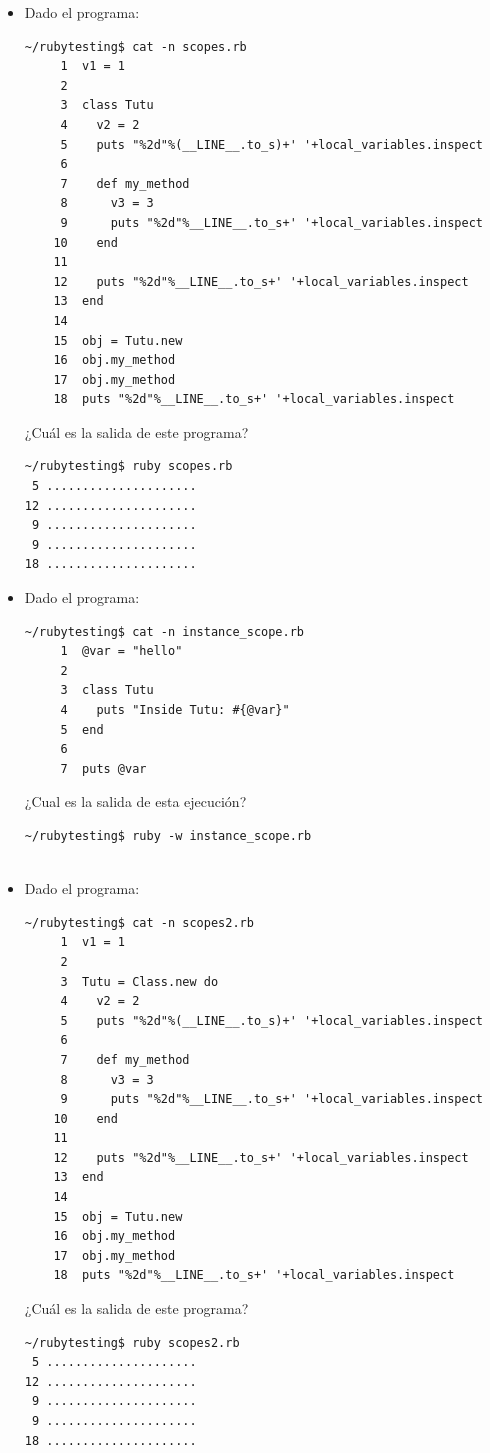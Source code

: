 \begin{itemize}
\begin{verbatim}
\end{verbatim}
 {\it is a command-line tool which allows you to easily install, manage, and work with multiple ruby environments from interpreters to sets of gems.}
\item Dado el programa:
\begin{verbatim}
~/rubytesting$ cat -n scopes.rb 
     1  v1 = 1                  
     2  
     3  class Tutu
     4    v2 = 2                
     5    puts "%2d"%(__LINE__.to_s)+' '+local_variables.inspect    
     6  
     7    def my_method
     8      v3 = 3
     9      puts "%2d"%__LINE__.to_s+' '+local_variables.inspect
    10    end
    11  
    12    puts "%2d"%__LINE__.to_s+' '+local_variables.inspect    
    13  end
    14  
    15  obj = Tutu.new
    16  obj.my_method        
    17  obj.my_method        
    18  puts "%2d"%__LINE__.to_s+' '+local_variables.inspect      
\end{verbatim}
¿Cuál es la salida de este programa?
\begin{verbatim}
~/rubytesting$ ruby scopes.rb 
 5 .....................
12 .....................
 9 .....................
 9 .....................
18 .....................
\end{verbatim}
\item Dado el programa:
\begin{verbatim}
~/rubytesting$ cat -n instance_scope.rb 
     1  @var = "hello"
     2  
     3  class Tutu
     4    puts "Inside Tutu: #{@var}"
     5  end
     6  
     7  puts @var
\end{verbatim}
¿Cual es la salida de esta ejecución?
\begin{verbatim}
~/rubytesting$ ruby -w instance_scope.rb 


\end{verbatim}

\item Dado el programa:
\begin{verbatim}
~/rubytesting$ cat -n scopes2.rb 
     1  v1 = 1                  
     2  
     3  Tutu = Class.new do
     4    v2 = 2                
     5    puts "%2d"%(__LINE__.to_s)+' '+local_variables.inspect    
     6  
     7    def my_method
     8      v3 = 3
     9      puts "%2d"%__LINE__.to_s+' '+local_variables.inspect
    10    end
    11  
    12    puts "%2d"%__LINE__.to_s+' '+local_variables.inspect    
    13  end
    14  
    15  obj = Tutu.new
    16  obj.my_method        
    17  obj.my_method        
    18  puts "%2d"%__LINE__.to_s+' '+local_variables.inspect      
\end{verbatim}
¿Cuál es la salida de este programa?
\begin{verbatim}
~/rubytesting$ ruby scopes2.rb 
 5 .....................
12 .....................
 9 .....................
 9 .....................
18 .....................
\end{verbatim}


\end{itemize}
